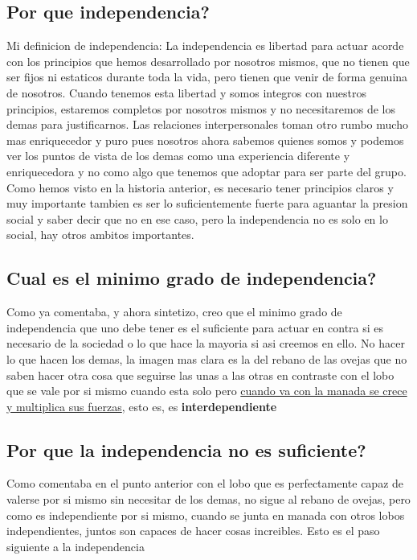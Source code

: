\subsection{Por que independencia?}
Mi definicion de independencia:
La independencia es libertad para actuar acorde con los principios que hemos desarrollado por nosotros mismos, que no tienen que ser fijos ni estaticos durante toda la vida, pero tienen que venir de forma genuina de nosotros. Cuando tenemos esta libertad y somos integros con nuestros principios, estaremos completos por nosotros mismos y no necesitaremos de los demas para justificarnos. Las relaciones interpersonales toman otro rumbo mucho mas enriquecedor y puro pues nosotros ahora sabemos quienes somos y podemos ver los puntos de vista de los demas como una experiencia diferente y enriquecedora y no como algo que tenemos que adoptar para ser parte del grupo.
Como hemos visto en la historia anterior, es necesario tener principios claros y muy importante tambien es ser lo suficientemente fuerte para aguantar la presion social y saber decir que no en ese caso, pero la independencia no es solo en lo social, hay otros ambitos importantes.
\subsection{Cual es el minimo grado de independencia?}
Como ya comentaba, y ahora sintetizo, creo que el minimo grado de independencia que uno debe tener es el suficiente para actuar en contra si es necesario de la sociedad o lo que hace la mayoria si asi creemos en ello. No hacer lo que hacen los demas, la imagen mas clara es la del rebano de las ovejas que no saben hacer otra cosa que seguirse las unas a las otras en contraste con el lobo que se vale por si mismo cuando esta solo pero \underline{cuando va con la manada se crece y multiplica sus fuerzas}, esto es, es \textbf{interdependiente}
\subsection{Por que la independencia no es suficiente?}
Como comentaba en el punto anterior con el lobo que es perfectamente capaz de valerse por si mismo sin necesitar de los demas, no sigue al rebano de ovejas, pero como es independiente por si mismo, cuando se junta en manada con otros lobos independientes, juntos son capaces de hacer cosas increibles.
Esto es el paso siguiente a la independencia

